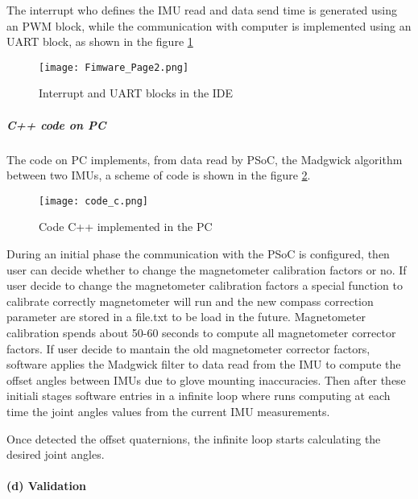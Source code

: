 \begin{enumerate}
\noindent The interrupt who defines the IMU read and data send time is generated using an PWM block, while the communication with computer is implemented using an UART block, as shown in the figure \ref{fig:firmwarepage1}


\begin{figure}[h]
\centering
\texttt{[image: Fimware\_Page2.png]}
\caption{Interrupt and UART blocks in the IDE}
\label{fig:firmwarepage1}
\end{figure}  
\end{enumerate} 

\subparagraph{C++ code on PC}
The code on PC implements, from data read by PSoC, the Madgwick algorithm between two IMUs, a scheme of code is shown in the figure \ref{fig:code_c}.  

\begin{figure}[h]
\centering
\texttt{[image: code\_c.png]}
\caption{Code C++ implemented in the PC}
\label{fig:code_c}
\end{figure}  

During an initial phase the communication with the PSoC is configured, then user can decide whether to change the magnetometer calibration factors or no. If user decide to change the magnetometer calibration factors a special function 
to calibrate correctly magnetometer will run and the new compass correction parameter are stored in a file.txt to be load in the future. Magnetometer calibration spends about 50-60 seconds to compute all magnetometer corrector factors. 
If user decide to mantain the old magnetometer corrector factors, software applies the Madgwick filter to data read from the IMU to compute the offset angles between IMUs due to glove mounting inaccuracies. Then after these initiali stages software entries in a infinite loop where runs computing at each time the joint angles values from the current IMU measurements. 

Once detected the offset quaternions, the infinite loop starts calculating the desired joint angles.
 
\paragraph{(d) Validation}

